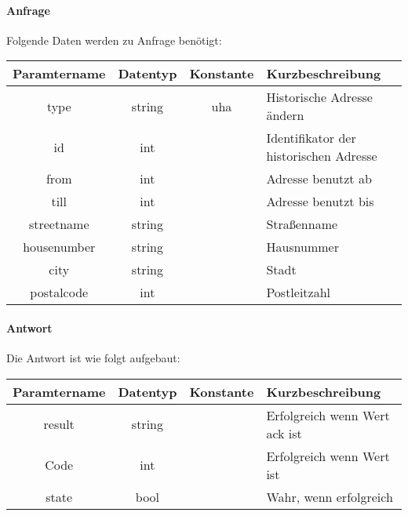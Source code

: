 \paragraph{Anfrage}Folgende Daten werden zu Anfrage benötigt:
\begin{table}[H]
	\begin{tabular}{|c|c|c|p{6.5cm}|}
		\hline
		\textbf{Paramtername} & \textbf{Datentyp} & \textbf{Konstante} & \textbf{Kurzbeschreibung}                                                                                               \\ \hline
		type                & string            & uha                & Historische Adresse ändern \\ \hline
		id                  & int               &                    & Identifikator der historischen Adresse \\ \hline
		from                & int               &                    & Adresse benutzt ab \\ \hline
		till                & int               &                    & Adresse benutzt bis \\ \hline
		streetname          & string            &                    & Straßenname \\ \hline
		housenumber         & string            &                    & Hausnummer \\ \hline
		city                & string            &                    & Stadt \\ \hline
		postalcode          & int               &                    & Postleitzahl \\ \hline
	\end{tabular}
\end{table}
\paragraph{Antwort}Die Antwort ist wie folgt aufgebaut:
\begin{table}[H]
	\begin{tabular}{|c|c|c|p{6.5cm}|}
		\hline
		\textbf{Paramtername} & \textbf{Datentyp} & \textbf{Konstante} & \textbf{Kurzbeschreibung}                                                                                               \\ \hline
		result              & string           &                 & Erfolgreich wenn Wert {\glqq ack\grqq} ist \\ \hline
		Code                & int              &                 & Erfolgreich wenn Wert {\glqq 0\grqq} ist \\ \hline
		state               & bool             &                 & Wahr, wenn erfolgreich \\ \hline
	\end{tabular}
\end{table}
